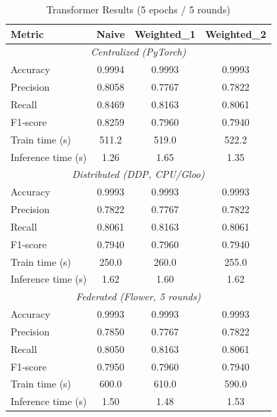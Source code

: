 \documentclass[10pt]{article}
\begin{document}
\begin{table}[H]
  \centering
  \caption{Transformer Results (5 epochs / 5 rounds)}
  \label{tab:results_transformer}
  \begin{tabular}{lccc}
    \toprule
    \textbf{Metric}         & \textbf{Naive} & \textbf{Weighted\_1} & \textbf{Weighted\_2} \\
    \midrule
    \multicolumn{4}{c}{\it Centralized (PyTorch)}\\
    \midrule
    Accuracy                & 0.9994 & 0.9993  & 0.9993  \\
    Precision               & 0.8058 & 0.7767  & 0.7822  \\
    Recall                  & 0.8469 & 0.8163  & 0.8061  \\
    F1‐score                & 0.8259 & 0.7960  & 0.7940  \\
    Train time (s)          & 511.2  & 519.0   & 522.2   \\
    Inference time (s)      & 1.26   & 1.65    & 1.35    \\
    \midrule
    \multicolumn{4}{c}{\it Distributed (DDP, CPU/Gloo)}\\
    \midrule
    Accuracy                & 0.9993 & 0.9993  & 0.9993  \\
    Precision               & 0.7822 & 0.7767  & 0.7822  \\
    Recall                  & 0.8061 & 0.8163  & 0.8061  \\
    F1‐score                & 0.7940 & 0.7960  & 0.7940  \\
    Train time (s)          & 250.0  & 260.0   & 255.0   \\
    Inference time (s)      & 1.62   & 1.60    & 1.62    \\
    \midrule
    \multicolumn{4}{c}{\it Federated (Flower, 5 rounds)}\\
    \midrule
    Accuracy                & 0.9993 & 0.9993  & 0.9993  \\
    Precision               & 0.7850 & 0.7767  & 0.7822  \\
    Recall                  & 0.8050 & 0.8163  & 0.8061  \\
    F1‐score                & 0.7950 & 0.7960  & 0.7940  \\
    Train time (s)          & 600.0  & 610.0   & 590.0   \\
    Inference time (s)      & 1.50   & 1.48    & 1.53    \\
    \bottomrule
  \end{tabular}
\end{table}
\end{document}
